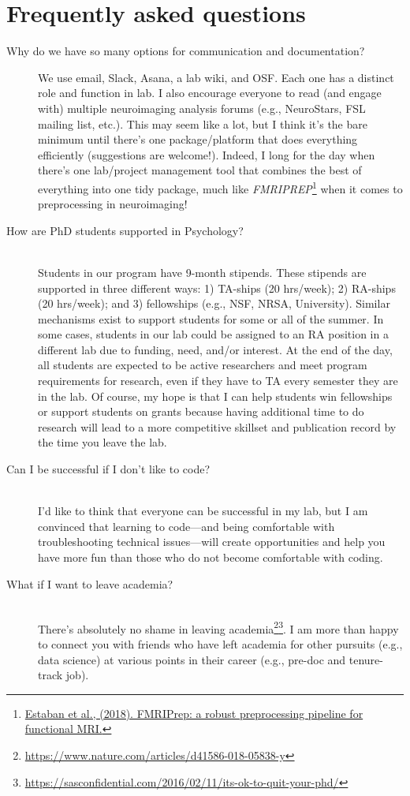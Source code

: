 \documentclass[letterpaper,12pt,oneside]{memoir}
\begin{document}
\chapter{Frequently asked questions}

\begin{description}
\item[Why do we have so many options for communication and documentation?] \hfill
We use email, Slack, Asana, a lab wiki, and OSF. Each one has a distinct role and function in lab. I also encourage everyone to read (and engage with) multiple neuroimaging analysis forums (e.g., NeuroStars, FSL mailing list, etc.). This may seem like a lot, but I think it's the bare minimum until there's one package/platform that does everything efficiently (suggestions are welcome!). Indeed, I long for the day when there's one lab/project management tool that combines the best of everything into one tidy package, much like \textit{FMRIPREP}\footnote{\href{https://www.biorxiv.org/content/early/2018/07/24/306951}{Estaban et al., (2018). FMRIPrep: a robust preprocessing pipeline for functional MRI.}} when it comes to preprocessing in neuroimaging! 
\item[How are PhD students supported in Psychology?] \hfill \\
Students in our program have 9-month stipends. These stipends are supported in three different ways: 1) TA-ships (20 hrs/week); 2) RA-ships (20 hrs/week); and 3) fellowships (e.g., NSF, NRSA, University). Similar mechanisms exist to support students for some or all of the summer. In some cases, students in our lab could be assigned to an RA position in a different lab due to funding, need, and/or interest. At the end of the day, all students are expected to be active researchers and meet program requirements for research, even if they have to TA every semester they are in the lab. Of course, my hope is that I can help students win fellowships or support students on grants because having additional time to do research will lead to a more competitive skillset and publication record by the time you leave the lab.
\item[Can I be successful if I don't like to code?] \hfill \\
I'd like to think that everyone can be successful in my lab, but I am convinced that learning to code---and being comfortable with troubleshooting technical issues---will create opportunities and help you have more fun than those who do not become comfortable with coding.
\item[What if I want to leave academia?] \hfill \\
There's absolutely no shame in leaving academia\footnote{\url{https://www.nature.com/articles/d41586-018-05838-y}}\footnote{\url{https://sasconfidential.com/2016/02/11/its-ok-to-quit-your-phd/}}. I am more than happy to connect you with friends who have left academia for other pursuits (e.g., data science) at various points in their career (e.g., pre-doc and tenure-track job). 
\end{description}
\end{document}
